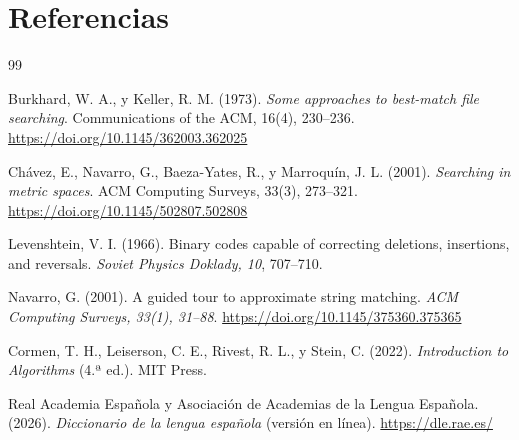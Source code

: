 \documentclass[11pt]{article}
\begin{document}
\section{Referencias}

\begin{thebibliography}{99}

Burkhard, W. A., y Keller, R. M. (1973).
\emph{Some approaches to best-match file searching}.
Communications of the ACM, 16(4), 230--236.
\url{https://doi.org/10.1145/362003.362025}

Chávez, E., Navarro, G., Baeza-Yates, R., y Marroquín, J. L. (2001).
\emph{Searching in metric spaces}.
ACM Computing Surveys, 33(3), 273--321.
\url{https://doi.org/10.1145/502807.502808}

Levenshtein, V. I. (1966).
Binary codes capable of correcting deletions, insertions, and reversals.
\emph{Soviet Physics Doklady, 10}, 707--710.

Navarro, G. (2001).
A guided tour to approximate string matching.
\emph{ACM Computing Surveys, 33(1), 31--88}.
\url{https://doi.org/10.1145/375360.375365}

Cormen, T. H., Leiserson, C. E., Rivest, R. L., y Stein, C. (2022).
\emph{Introduction to Algorithms} (4.ª ed.).
MIT Press.

Real Academia Española y Asociación de Academias de la Lengua Española.
(2026). \emph{Diccionario de la lengua española} (versión en línea).
\url{https://dle.rae.es/}

\end{thebibliography}
\end{document}
